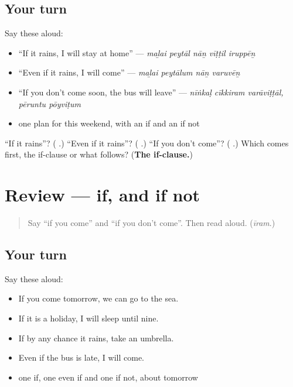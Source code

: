 \subsection*{Your turn}
Say these aloud:

\begin{itemize}
\raggedright
  \item \textquotedblleft{}If it rains, I will stay at home\textquotedblright{} — \emph{maḻai peytāl nāṉ vīṭṭil iruppēṉ}
  \item \textquotedblleft{}Even if it rains, I will come\textquotedblright{} — \emph{maḻai peytālum nāṉ varuvēṉ}
  \item \textquotedblleft{}If you don't come soon, the bus will leave\textquotedblright{} — \emph{nīṅkaḷ cīkkiram varāviṭṭāl, pēruntu pōyviṭum}
  \item one plan for this weekend, with an if and an if not
\end{itemize}

\begin{tcolorbox}[breakable,colback=teal!4,colframe=teal!35!black,title={Before you move on}]
\textquotedblleft{}If it rains\textquotedblright{}? (\textbf{ }.) \textquotedblleft{}Even if it rains\textquotedblright{}? (\textbf{ }.) \textquotedblleft{}If you don't come\textquotedblright{}? (\textbf{ }.) Which comes first, the if-clause or what follows? (\textbf{The if-clause.})
\end{tcolorbox}
\section[(review)]{Review — if, and if not}

\label{lesson:TA-R292-if-and-if-not}



\begin{quote}
Say \textquotedblleft{}if you come\textquotedblright{} and \textquotedblleft{}if you don't come\textquotedblright{}. Then read \textbf{} aloud. (\emph{īram}.)
\end{quote}

\subsection*{Your turn}
Say these aloud:

\begin{itemize}
\raggedright
  \item If you come tomorrow, we can go to the sea.
  \item If it is a holiday, I will sleep until nine.
  \item If by any chance it rains, take an umbrella.
  \item Even if the bus is late, I will come.
  \item one if, one even if and one if not, about tomorrow
\end{itemize}

